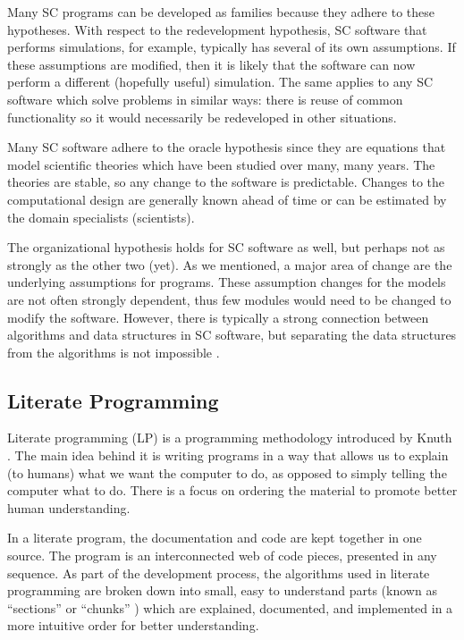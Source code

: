 \documentclass[10pt, preprint]{sigplanconf}
\begin{document}
Many SC programs can be developed as families because they adhere to these
hypotheses. With respect to the redevelopment hypothesis, SC software that
performs simulations, for example, typically has several of its own
assumptions. If these assumptions are modified, then it is likely that the
software can now perform a different (hopefully useful) simulation. The same
applies to any SC software which solve problems in similar ways: there is reuse
of common functionality so it would necessarily be redeveloped in other
situations.

Many SC software adhere to the oracle hypothesis since they are equations that
model scientific theories which have been studied over many, many years. The
theories are stable, so any change to the software is predictable. Changes to
the computational design are generally known ahead of time or can be estimated
by the domain specialists (scientists).

The organizational hypothesis holds for SC software as well, but perhaps not as
strongly as the other two (yet). As we mentioned, a major area of change are the
underlying assumptions for programs. These assumption changes for the models are
not often strongly dependent, thus few modules would need to be changed to
modify the software. However, there is typically a strong connection between
algorithms and data structures in SC software, but separating the data
structures from the algorithms is not impossible \cite{Berti2000a, ElSheikhEtAl2004}.


\subsection{Literate Programming} \label{subsec:literate}

Literate programming (LP) is a programming methodology introduced by Knuth
\cite{Knuth1984}. The main idea behind it is writing programs in a way that
allows us to explain (to humans) what we want the computer to do, as opposed to
simply telling the computer what to do. There is a focus on ordering the
material to promote better human understanding.

In a literate program, the documentation and code are kept together in one
source. The program is an interconnected web of code pieces, presented in any
sequence. As part of the development process, the algorithms used in literate
programming are broken down into small, easy to understand parts (known as
``sections'' \cite{Knuth1984} or ``chunks'' \cite{Johnson1997}) which are
explained, documented, and implemented in a more intuitive order for better
understanding.
\end{document}
